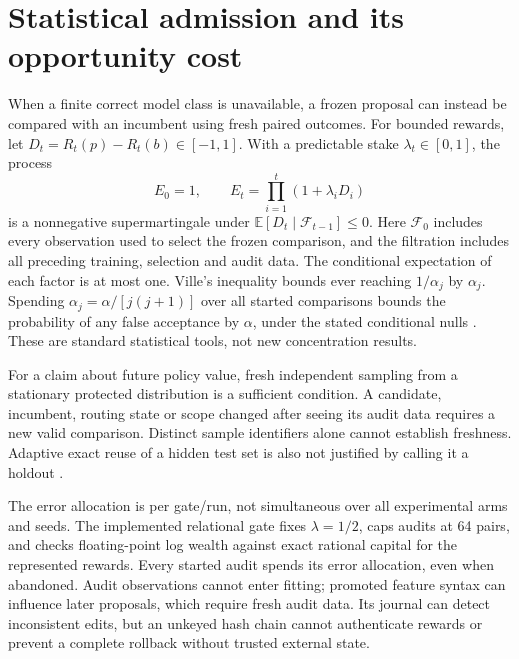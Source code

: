 \documentclass[10pt,twocolumn]{article}
\newcommand{\E}{\mathbb{E}}
\begin{document}
\section{Statistical admission and its opportunity cost}\label{sec:statistical}
When a finite correct model class is unavailable, a frozen proposal can instead
be compared with an incumbent using fresh paired outcomes. For bounded rewards,
let $D_t=R_t(p)-R_t(b)\in[-1,1]$. With a predictable stake
$\lambda_t\in[0,1]$, the process
\begin{equation}\label{eq:eprocess}
 E_0=1,\qquad E_t=\prod_{i=1}^t(1+\lambda_iD_i)
\end{equation}
is a nonnegative supermartingale under
$\E[D_t\mid\mathcal F_{t-1}]\leq0$. Here $\mathcal F_0$ includes every
observation used to select the frozen comparison, and the filtration includes
all preceding training, selection and audit data. The conditional expectation
of each factor
is at most one. Ville's inequality bounds ever reaching $1/\alpha_j$ by
$\alpha_j$. Spending $\alpha_j=\alpha/[j(j+1)]$ over all started comparisons
bounds the probability of any false acceptance by $\alpha$, under the stated
conditional nulls \citep{waudby2024betting,howard2021confidence}. These are
standard statistical tools, not new concentration results.

For a claim about future policy value, fresh independent sampling from a
stationary protected distribution is a sufficient condition. A candidate,
incumbent, routing state or scope changed after seeing its audit data requires
a new valid comparison. Distinct sample identifiers alone cannot establish
freshness. Adaptive exact reuse of a hidden test set is also not justified by
calling it a holdout \citep{dwork2015holdout}.

The error allocation is per gate/run, not simultaneous over all experimental
arms and seeds. The implemented relational gate fixes $\lambda=1/2$, caps audits at 64 pairs,
and checks floating-point log wealth against exact rational capital for the
represented rewards. Every started audit spends its error allocation, even
when abandoned. Audit observations cannot enter fitting; promoted feature
syntax can influence later proposals, which require fresh audit data. Its
journal can detect inconsistent edits, but an unkeyed hash chain cannot
authenticate rewards or prevent a complete rollback without trusted external
state.
\end{document}
